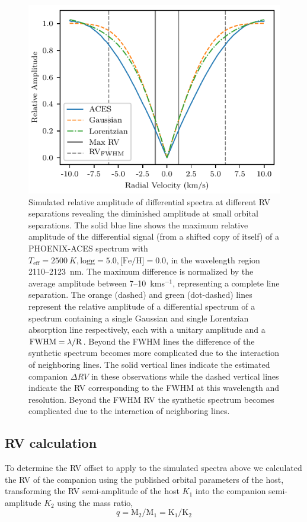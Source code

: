 \documentclass[fleqn,usenatbib]{mnras}
\begin{document}
    \begin{figure}
        \includegraphics[width=\hsize]{images/relative_amplitude.pdf}
        \caption{Simulated relative amplitude of differential spectra at different RV separations revealing the diminished amplitude at small orbital separations. The solid blue line shows the maximum relative amplitude of the differential signal (from a shifted copy of itself) of a PHOENIX-ACES spectrum with \(T_{\textrm{eff}}=2500~K, \textrm{logg}=5.0, \textrm{[Fe/H]}=0.0\), in the wavelength region 2110--2123~nm. The maximum difference is normalized by the average amplitude between 7--10~kms\(^{-1}\), representing a complete line separation. The orange (dashed) and green (dot-dashed) lines represent the relative amplitude of a differential spectrum of a spectrum containing a single Gaussian and single Lorentzian absorption line respectively, each with a unitary amplitude and a \(\rm FWHM = \lambda / R \). Beyond the FWHM lines the difference of the synthetic spectrum becomes more complicated due to the interaction of neighboring lines. The solid vertical lines indicate the estimated companion \(\Delta RV\) in these observations while the dashed vertical lines indicate the RV corresponding to the FWHM at this wavelength and resolution. Beyond the FWHM RV the synthetic spectrum becomes complicated due to the interaction of neighboring lines.}
        
        \label{fig:diff_amp}
    \end{figure}
    
    
    \subsection{RV calculation}
    To determine the RV offset to apply to the simulated spectra above we calculated the RV of the companion using the published orbital parameters of the host, transforming the RV semi-amplitude of the host \(K_{1} \) into the companion semi-amplitude \(K_{2} \) using the mass ratio,
    \begin{equation}
    \label{eqn:mass_ratio}
    q = \textrm{M}_{2} / \textrm{M}_{1} = \textrm{K}_{1} / \textrm{K}_{2}
    \end{equation}
    
\end{document}
